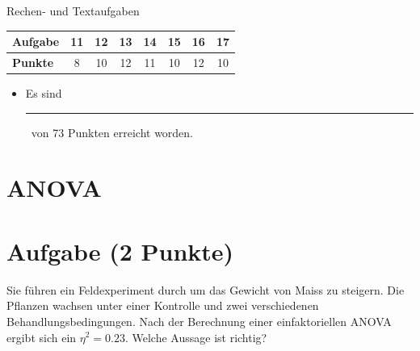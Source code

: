\documentclass[a4paper, 9pt]{scrartcl}\usepackage[]{graphicx}\usepackage[]{xcolor}
\begin{document}
\begin{graybox}{Rechen- und Textaufgaben}
  \begin{center}
    \large
    \begin{tabular}{|l|c|c|c|c|c|c|c|}
      \hline
      \textbf{Aufgabe} & 11 & 12 & 13 & 14 & 15 & 16 & 17 \strut\\
      \hline
      \textbf{Punkte} & 
      \hspace{1Ex}\Large\textcolor{gray!70}{8}\hspace{1Ex}  & 
      \hspace{1Ex}\Large\textcolor{gray!70}{10}\hspace{1Ex}  & 
      \hspace{1Ex}\Large\textcolor{gray!70}{12}\hspace{1Ex}  & 
      \hspace{1Ex}\Large\textcolor{gray!70}{11}\hspace{1Ex}  & 
      \hspace{1Ex}\Large\textcolor{gray!70}{10}\hspace{1Ex}  & 
      \hspace{1Ex}\Large\textcolor{gray!70}{12}\hspace{1Ex}  & 
      \hspace{1Ex}\Large\textcolor{gray!70}{10}\hspace{1Ex} \strut\\
      \hline
  \end{tabular}
\end{center}
\begin{itemize}
\item Es sind \rule[0ex]{2em}{.4pt}\, von 73 Punkten erreicht worden.
\end{itemize}
\end{graybox}

\clearpage

\section*{ANOVA}

\section{Aufgabe \hfill (2 Punkte)}



Sie f{\"u}hren ein Feldexperiment durch um das Gewicht von Maiss zu
steigern. Die Pflanzen wachsen unter einer Kontrolle und zwei verschiedenen
Behandlungsbedingungen. Nach der Berechnung einer einfaktoriellen ANOVA
ergibt sich ein $\eta^2 = 0.23$. Welche Aussage ist richtig?
\end{document}
